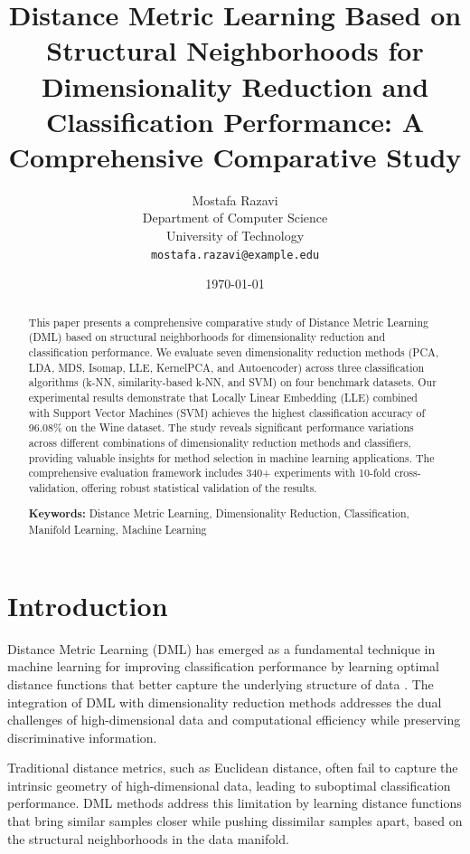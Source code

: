\documentclass[12pt,a4paper]{article}
\title{Distance Metric Learning Based on Structural Neighborhoods for Dimensionality Reduction and Classification Performance: A Comprehensive Comparative Study}
\author{
Mostafa Razavi\\
Department of Computer Science\\
University of Technology\\
\texttt{mostafa.razavi@example.edu}
}
\date{\today}
\begin{document}
\maketitle

\begin{abstract}
This paper presents a comprehensive comparative study of Distance Metric Learning (DML) based on structural neighborhoods for dimensionality reduction and classification performance. We evaluate seven dimensionality reduction methods (PCA, LDA, MDS, Isomap, LLE, KernelPCA, and Autoencoder) across three classification algorithms (k-NN, similarity-based k-NN, and SVM) on four benchmark datasets. Our experimental results demonstrate that Locally Linear Embedding (LLE) combined with Support Vector Machines (SVM) achieves the highest classification accuracy of 96.08\% on the Wine dataset. The study reveals significant performance variations across different combinations of dimensionality reduction methods and classifiers, providing valuable insights for method selection in machine learning applications. The comprehensive evaluation framework includes 340+ experiments with 10-fold cross-validation, offering robust statistical validation of the results.

\textbf{Keywords:} Distance Metric Learning, Dimensionality Reduction, Classification, Manifold Learning, Machine Learning
\end{abstract}

\section{Introduction}

Distance Metric Learning (DML) has emerged as a fundamental technique in machine learning for improving classification performance by learning optimal distance functions that better capture the underlying structure of data \cite{kulis2012metric}. The integration of DML with dimensionality reduction methods addresses the dual challenges of high-dimensional data and computational efficiency while preserving discriminative information.

Traditional distance metrics, such as Euclidean distance, often fail to capture the intrinsic geometry of high-dimensional data, leading to suboptimal classification performance. DML methods address this limitation by learning distance functions that bring similar samples closer while pushing dissimilar samples apart, based on the structural neighborhoods in the data manifold.
\end{document}
